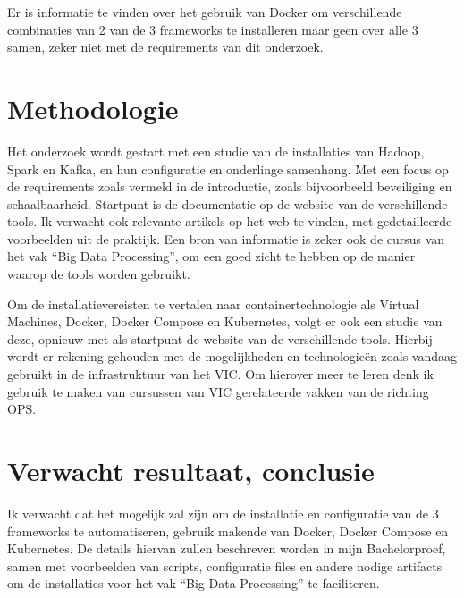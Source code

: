 Er is informatie te vinden over het gebruik van Docker om verschillende combinaties van 2 van de 3 frameworks te installeren maar geen over alle 3 samen, zeker niet met de requirements van dit onderzoek. 


\section{Methodologie}%
\label{sec:methodologie}
Het onderzoek wordt gestart met een studie van de installaties van Hadoop, Spark en Kafka, en hun configuratie en onderlinge samenhang.
Met een focus op de requirements zoals vermeld in de introductie, zoals bijvoorbeeld beveiliging en schaalbaarheid.
Startpunt is de documentatie op de website van de verschillende tools. Ik verwacht ook relevante artikels op het web te vinden, met gedetailleerde voorbeelden uit de praktijk.
Een bron van informatie is zeker ook de cursus van het vak ``Big Data Processing'', om een goed zicht te hebben op de manier waarop de tools worden gebruikt.

Om de installatievereisten te vertalen naar containertechnologie als Virtual Machines, Docker, Docker Compose en Kubernetes, volgt er ook een studie van deze, opnieuw met als startpunt de website van de verschillende tools.
Hierbij wordt er rekening gehouden met de mogelijkheden en technologieën zoals vandaag gebruikt in de infrastruktuur van het VIC. Om hierover meer te leren denk ik gebruik te maken van cursussen van VIC gerelateerde vakken van de richting OPS.

\section{Verwacht resultaat, conclusie}%
\label{sec:verwachte_resultaten}
Ik verwacht dat het mogelijk zal zijn om de installatie en configuratie van de 3 frameworks te automatiseren, gebruik makende van Docker, Docker Compose en Kubernetes.
De details hiervan zullen beschreven worden in mijn Bachelorproef, samen met voorbeelden van scripts, configuratie files en andere nodige artifacts om de installaties voor het vak ``Big Data Processing'' te faciliteren.
